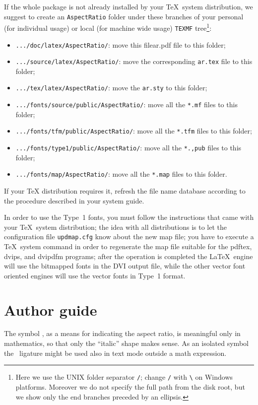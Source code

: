 \documentclass[a4paper]{article}
\newcommand\file[1]{\texttt{#1}}
\begin{document}
If the whole package is not already installed by your \TeX\ system distribution, we suggest to create an \file{AspectRatio} folder under these branches of your personal (for individual usage) or local (for machine wide usage) \file{TEXMF} tree\footnote{Here we use the UNIX folder separator \texttt{/}; change \texttt{/} with \texttt{\textbackslash} on Windows platforms. Moreover we do not specify the full path from the disk root, but we show only the end branches preceded by an ellipsis.}:
\begin{itemize}
\item \file{.../doc/latex/AspectRatio/}: move this file{ar.pdf} file to this folder;
\item \file{.../source/latex/AspectRatio/}: move the corresponding \file{ar.tex} file to this folder;
\item \file{.../tex/latex/AspectRatio/}: move the \file{ar.sty} to this folder;
\item \file{.../fonts/source/public/AspectRatio/}: move all the \file{*.mf} files to this folder;
\item \file{.../fonts/tfm/public/AspectRatio/}: move all the \file{*.tfm} files to this folder;
\item \file{.../fonts/type1/public/AspectRatio/}: move all the \file{*.,pub} files to this folder;
\item \file{.../fonts/map/AspectRatio/}: move all the \file{*.map} files to this folder.
\end{itemize}
If your TeX distribution requires it, refresh the file name database according to the procedure described in your system guide.

In order to use the Type~1 fonts, you must follow the instructions that came with your \TeX\ system distribution; the idea with all distributions is to let the configuration file \file{updmap.cfg} know about the new map file;  you have to execute a \TeX\ system command  in order to regenerate the map file suitable for the pdftex, dvips, and dvipdfm programs; after the operation is completed the \LaTeX\ engine will use the bitmapped fonts in the DVI output file, while the other vector font oriented engines will use the vector fonts in Type~1 format.

\section{Author guide}

The symbol \AR, as a means for indicating the aspect ratio, is meaningful only in mathematics, so that only the ``italic'' shape makes sense. As an isolated symbol the \AR\ ligature might be used also in text mode outside a math expression.
\end{document}

